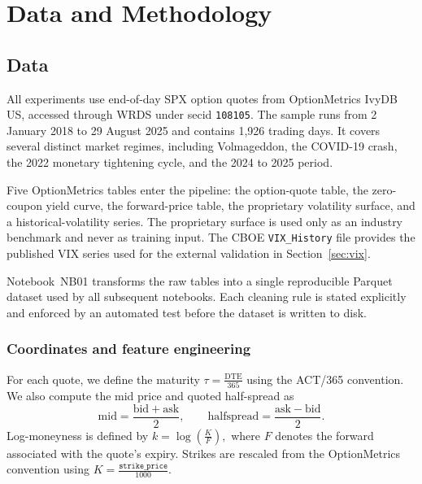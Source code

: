 \chapter{Data and Methodology}\label{ch:data}

\section{Data}\label{sec:data}

All experiments use end-of-day SPX option quotes from OptionMetrics IvyDB US, accessed through
WRDS under secid \texttt{108105}. The sample runs from 2 January 2018 to 29 August 2025 and
contains 1,926 trading days. It covers several distinct market regimes, including Volmageddon,
the COVID-19 crash, the 2022 monetary tightening cycle, and the 2024 to 2025 period.

Five OptionMetrics tables enter the pipeline: the option-quote table, the zero-coupon yield
curve, the forward-price table, the proprietary volatility surface, and a historical-volatility
series. The proprietary surface is used only as an industry benchmark and never as training
input. The CBOE \texttt{VIX\_History} file provides the published VIX series used for the
external validation in Section~\ref{sec:vix}.

Notebook~NB01 transforms the raw tables into a single reproducible Parquet dataset used by all
subsequent notebooks. Each cleaning rule is stated explicitly and enforced by an automated test
before the dataset is written to disk.

\subsection{Coordinates and feature engineering}\label{sec:coords}

For each quote, we define the maturity $\tau=\frac{\mathrm{DTE}}{365}$ using the ACT/365 convention. We also compute the mid price and quoted half-spread as
\[
\mathrm{mid}=\frac{\mathrm{bid}+\mathrm{ask}}{2},
\qquad
\mathrm{halfspread}=\frac{\mathrm{ask}-\mathrm{bid}}{2}.
\]
Log-moneyness is defined by $k=\log\!\left(\frac{K}{F}\right),$
where $F$ denotes the forward associated with the quote's expiry. Strikes are rescaled from the OptionMetrics convention using $K=\frac{\texttt{strike\_price}}{1000}.$

